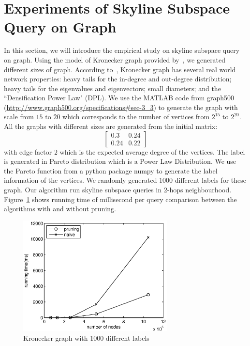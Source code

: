 \section{Experiments of Skyline Subspace Query on Graph}
\label{ch:exp:graph}
In this section, we will introduce the empirical study on skyline subspace query on graph.
Using the model of Kronecker graph provided by~\cite{leskovec2005realistic}, we generated different sizes of graph.
According to~\cite{leskovec2005realistic}, Kronecker graph has several real world network properties:
heavy tails for the in-degree and out-degree distribution;
heavy tails for the eigenvalues and eigenvectors;
small diameters; and the ``Densification Power Law" (DPL).
We use the MATLAB code from graph500 (\url{http://www.graph500.org/specifications#sec-3_3}) to generate the graph with scale from $15$ to $20$ which corresponds to the number of vertices from $2^{15}$ to $2^{20}$. All the graphs with different sizes are generated from the initial matrix:
\begin{equation}
\begin{bmatrix}
0.3 & 0.24\\ 
0.24 & 0.22
\end{bmatrix}
\end{equation}
with edge factor $2$ which is the expected average degree of the vertices. The label is generated in Pareto distribution which is a Power Law Distribution. We use the Pareto function from a python package numpy to generate the label information of the vertices. We randomly generated 1000 different labels for these graph. Our algorithm run skyline subspace queries in $2$-hops neighbourhood. Figure~\ref{fig:exp:kronecker} shows running time of millisecond per query comparison between the algorithms with and without pruning.

\begin{figure}[h]
    \centering
      \includegraphics[width=0.7\textwidth]{figs/kronecker}
    \caption{\label{fig:exp:kronecker}Kronecker graph with 1000 different labels}
\end{figure}

